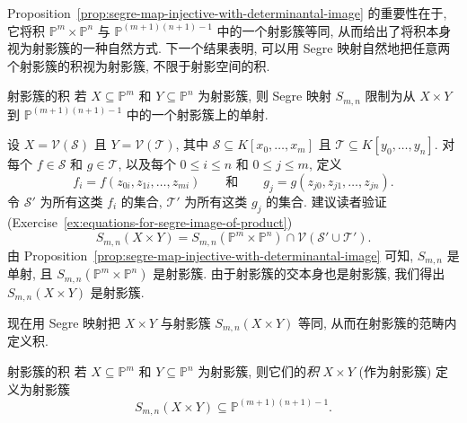 Proposition~\ref{prop:segre-map-injective-with-determinantal-image} 的重要性在于, 它将积 $\mathbb{P}^{m}\times\mathbb{P}^{n}$ 与 $\mathbb{P}^{(m+1)(n+1)-1}$ 中的一个射影簇等同, 从而给出了将积本身视为射影簇的一种自然方式. 下一个结果表明, 可以用 Segre 映射自然地把任意两个射影簇的积视为射影簇, 不限于射影空间的积.

\begin{Proposition}{射影簇的积}\leavevmode\label{prop:segre-map-restricts-to-product-of-projective-varieties}
若 $X\subseteq\mathbb{P}^{m}$ 和 $Y\subseteq\mathbb{P}^{n}$ 为射影簇, 则 Segre 映射 $S_{m,n}$ 限制为从 $X\times Y$ 到 $\mathbb{P}^{(m+1)(n+1)-1}$ 中的一个射影簇上的单射.
\end{Proposition}
\begin{Proof}
设 $X=\mathcal{V}(\mathcal{S})$ 且 $Y=\mathcal{V}(\mathcal{T})$, 其中 $\mathcal{S}\subseteq K[x_{0},\ldots,x_{m}]$ 且 $\mathcal{T}\subseteq K[y_{0},\ldots,y_{n}]$. 对每个 $f\in\mathcal{S}$ 和 $g\in\mathcal{T}$, 以及每个 $0\le i\le n$ 和 $0\le j\le m$, 定义
\[
  f_{i}=f(z_{0i},z_{1i},\ldots,z_{mi})
  \qquad\text{和}\qquad
  g_{j}=g(z_{j0},z_{j1},\ldots,z_{jn}).
\]
令 $\mathcal{S}'$ 为所有这类 $f_{i}$ 的集合, $\mathcal{T}'$ 为所有这类 $g_{j}$ 的集合. 建议读者验证 (Exercise~\ref{ex:equations-for-segre-image-of-product})
\[
  S_{m,n}(X\times Y)=S_{m,n}(\mathbb{P}^{m}\times\mathbb{P}^{n})
  \cap\mathcal{V}(\mathcal{S}'\cup\mathcal{T}').
\]
由 Proposition~\ref{prop:segre-map-injective-with-determinantal-image} 可知, $S_{m,n}$ 是单射, 且 $S_{m,n}(\mathbb{P}^{m}\times\mathbb{P}^{n})$ 是射影簇. 由于射影簇的交本身也是射影簇, 我们得出 $S_{m,n}(X\times Y)$ 是射影簇.
\end{Proof}

现在用 Segre 映射把 $X\times Y$ 与射影簇 $S_{m,n}(X\times Y)$ 等同, 从而在射影簇的范畴内定义积.

\begin{Definition}{射影簇的积}\leavevmode\label{def:product-of-projective-varieties}
若 $X\subseteq\mathbb{P}^{m}$ 和 $Y\subseteq\mathbb{P}^{n}$ 为射影簇, 则它们的\emph{积} $X\times Y$ (作为射影簇) 定义为射影簇
\[
  S_{m,n}(X\times Y)\subseteq\mathbb{P}^{(m+1)(n+1)-1}.
\]
\end{Definition}

